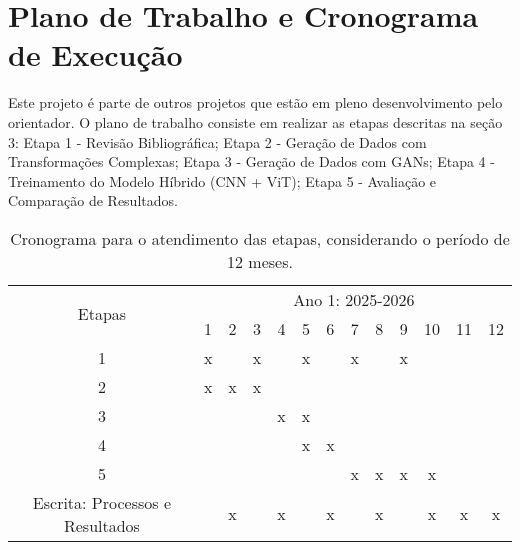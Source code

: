 \section{Plano de Trabalho e Cronograma de Execução}

Este projeto é parte de outros projetos que estão em pleno desenvolvimento pelo orientador. O plano de trabalho consiste em realizar as etapas descritas na seção 3: Etapa 1 - Revisão Bibliográfica; Etapa 2 - Geração de Dados com Transformações Complexas; Etapa 3 - Geração de Dados com GANs; Etapa 4 - Treinamento do Modelo Híbrido (CNN + ViT); Etapa 5 - Avaliação e Comparação de Resultados.

\begin{table}[h]

\caption{Cronograma para o atendimento das etapas, considerando o período de 12 meses.}

\label{tab:cronograma}
	\centering
		\begin{tabular} {|c|c|c|c|c|c|c|c|c|c|c|c|c|}
		\hline
		\multirow{2}{*}{Etapas}
		&\multicolumn{12}{c|}{Ano 1: 2025-2026}\\ \cline{2-13}
		&1&2&3&4&5&6&7&8&9&10&11&12\\
		\hline
		1&x&&x&&x&&x&&x&&&\\
		\hline
		2&x&x&x&&&&&&&&&\\
		\hline	
		3&&&&x&x&&&&&&&\\
		\hline			
		4&&&&&x&x&&&&&&\\
		\hline	
		5&&&&&&&x&x&x&x&&\\
		\hline	
		

		Escrita: Processos e Resultados&&x&&x&&x&&x&&x&x&x\\
		\hline
		\end{tabular}
\end{table}